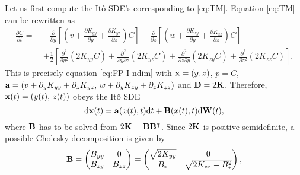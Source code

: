 Let us first compute the Itô SDE's corresponding to \eqref{eq:TM}. Equation \eqref{eq:TM} can be rewritten as
\begin{align}
	\frac{\partial C}{\partial t} =~& -\frac{\partial}{\partial y}\left[\left(v+\frac{\partial K_{yy}}{\partial y} + \frac{\partial K_{yz}}{\partial z}\right)C\right] -\frac{\partial}{\partial z}\left[\left(w+\frac{\partial K_{zy}}{\partial y} + \frac{\partial K_{zz}}{\partial z}\right)C\right] \nonumber\\
	&+ \frac{1}{2}\left[\frac{\partial^2}{\partial y^2} \left(2K_{yy} C\right) + \frac{\partial^2}{\partial y \partial z} \left(2K_{yz} C\right) + \frac{\partial^2}{\partial z \partial y} \left(2K_{zy} C\right) + \frac{\partial^2}{\partial z^2} \left(2K_{zz} C\right) \right].
\end{align}
This is precisely equation \eqref{eq:FP-I-ndim} with $\mathbf x =(y,z)$, $p=C$, $\mathbf a = (v+\partial_y K_{yy} + \partial_z K_{yz},\, w+\partial_y K_{zy} + \partial_z K_{zz})$ and $\mathbf D = 2\mathbf K$. Therefore, $\mathbf x(t) = (y(t),\, z(t))$ obeys the Itô SDE
\begin{equation} \label{eq:ito-TM-vec}
	\mathrm d \mathbf x(t) = \mathbf a(x(t),t) \mathrm dt + \mathbf B(x(t),t) \mathrm d \mathbf W(t),
\end{equation}
where $\mathbf B$ has to be solved from $2\mathbf K = \mathbf B \mathbf B^{\intercal}$. Since $2\mathbf K$ is positive semidefinite, a possible Cholesky decomposition is given by
\begin{equation} \label{eq:B}
	\mathbf B = \begin{pmatrix} B_{yy} & 0 \\ B_{zy} & B_{zz} \end{pmatrix} = \begin{pmatrix} \sqrt{2K_{yy}} & 0 \\ B_* & \sqrt{2K_{zz}-B_*^2} \end{pmatrix},
\end{equation}
